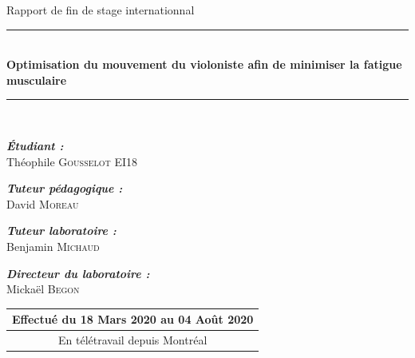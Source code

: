 \begin{titlepage}
\AddToShipoutPicture*{\imagedefond}
\AddToShipoutPicture*{\imagepagedegarde}

    \begin{center}
    
    \phantom{}
    
    \vspace{5.5cm}
    
    \LARGE{Rapport de fin de stage internationnal}
    
    \rule{\linewidth}{0.5mm}\\
    {\huge \bfseries Optimisation du mouvement du violoniste afin de minimiser la fatigue musculaire \\}
    \rule[0.25cm]{\linewidth}{0.5mm}\\[2.7cm]
    \end{center}
    
        
    \begin{flushright}
    \begin{minipage}[c]{10.8cm}
        {\itshape \bfseries \'Etudiant :}\\
        \tab Théophile \textsc{Gousselot EI18}\par
        \vspace{0.3cm}
        {\itshape \bfseries Tuteur pédagogique :}\\
        \tab David \textsc{Moreau}\par
        \vspace{0.3cm}
        {\itshape \bfseries  Tuteur laboratoire :}\\
        \tab Benjamin \textsc{Michaud}\par
        \vspace{0.3cm}
        {\itshape \bfseries  Directeur du laboratoire :}\\
        \tab Mickaël \textsc{Begon}\par
    \end{minipage}
    \end{flushright}
    

    \begin{center}
    \begin{minipage}[c]{8cm}
    \vspace{4cm}
    
    \begin{tabular}{c}
    \hline
    Effectué du 18 Mars 2020 au 04 Août 2020 \\
    \hline
    En télétravail depuis Montréal\\
    \hline
    \end{tabular}
    

    \end{minipage}
    \end{center}
\end{titlepage} 
